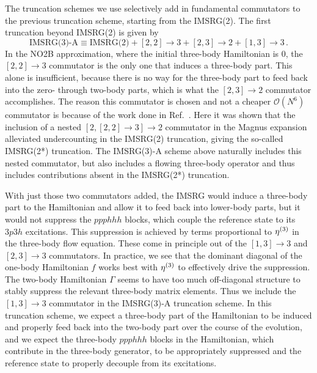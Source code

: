 The truncation schemes we use
selectively add in fundamental commutators
to the previous truncation scheme,
starting from the IMSRG(2).
The first truncation beyond IMSRG(2) is given by
\begin{equation}
    \text{IMSRG(3)-A} \equiv \text{IMSRG(2)} + [2, 2] \rightarrow 3
    + [2, 3] \rightarrow 2
    + [1, 3] \rightarrow 3\,.
\end{equation}
In the NO2B approximation,
where the initial three-body Hamiltonian is 0,
the $[2, 2] \rightarrow 3$ commutator
is the only one that induces a three-body part.
This alone is insufficient,
because there is no way for the three-body part
to feed back into the zero- through two-body parts,
which is what the $[2, 3] \rightarrow 2$ commutator
accomplishes.
The reason this commutator is chosen
and not a cheaper $\mathcal{O}(N^6)$ commutator
is because of the work done in Ref.~\cite{Morr16imsrg_phd}.
Here it was shown that the inclusion
of a nested $[2, [2, 2] \rightarrow 3] \rightarrow 2$
commutator in the Magnus expansion
alleviated undercounting in the IMSRG(2) truncation,
giving the so-called IMSRG(2*) truncation.
The IMSRG(3)-A scheme above naturally includes
this nested commutator,
but also includes a flowing three-body operator
and thus includes contributions absent in the IMSRG(2*) truncation.

With just those two commutators added,
the IMSRG would induce a three-body part to the Hamiltonian
and allow it to feed back into lower-body parts,
but it would not suppress the $ppphhh$ blocks,
which couple the reference state to its $3p3h$ excitations.
This suppression is achieved by terms
proportional to $\eta^{(3)}$ in the three-body flow equation.
These come in principle out of
the $[1,3]\rightarrow 3$
and $[2,3]\rightarrow 3$ commutators.
In practice,
we see that the dominant diagonal of
the one-body Hamiltonian $f$
works best with $\eta^{(3)}$
to effectively drive the suppression.
The two-body Hamiltonian $\Gamma$
seems to have too much off-diagonal structure
to stably suppress the relevant three-body matrix elements.
Thus we include
the $[1,3]\rightarrow 3$ commutator
in the IMSRG(3)-A truncation scheme.
In this truncation scheme,
we expect a three-body part of the Hamiltonian to be induced
and properly feed back into the two-body part over the course of the evolution,
and we expect the three-body $ppphhh$ blocks in the Hamiltonian,
which contribute in the three-body generator,
to be appropriately suppressed
and the reference state to properly decouple from its excitations.


